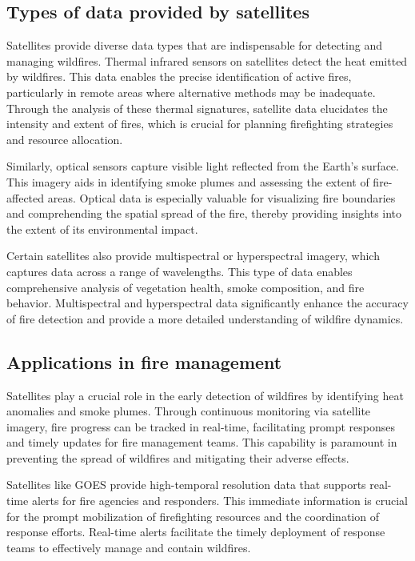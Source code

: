 \documentclass[
  12 pt,
]{Nemilov}
\begin{document}
\subsection{Types of data provided by satellites}\label{types-of-data-provided-by-satellites}

Satellites provide diverse data types that are indispensable for detecting and managing wildfires. Thermal infrared sensors on satellites detect the heat emitted by wildfires. This data enables the precise identification of active fires, particularly in remote areas where alternative methods may be inadequate. Through the analysis of these thermal signatures, satellite data elucidates the intensity and extent of fires, which is crucial for planning firefighting strategies and resource allocation.

Similarly, optical sensors capture visible light reflected from the Earth's surface. This imagery aids in identifying smoke plumes and assessing the extent of fire-affected areas. Optical data is especially valuable for visualizing fire boundaries and comprehending the spatial spread of the fire, thereby providing insights into the extent of its environmental impact.

Certain satellites also provide multispectral or hyperspectral imagery, which captures data across a range of wavelengths. This type of data enables comprehensive analysis of vegetation health, smoke composition, and fire behavior. Multispectral and hyperspectral data significantly enhance the accuracy of fire detection and provide a more detailed understanding of wildfire dynamics.

\subsection{Applications in fire management}\label{applications-in-fire-management}

Satellites play a crucial role in the early detection of wildfires by identifying heat anomalies and smoke plumes. Through continuous monitoring via satellite imagery, fire progress can be tracked in real-time, facilitating prompt responses and timely updates for fire management teams. This capability is paramount in preventing the spread of wildfires and mitigating their adverse effects.

Satellites like GOES provide high-temporal resolution data that supports real-time alerts for fire agencies and responders. This immediate information is crucial for the prompt mobilization of firefighting resources and the coordination of response efforts. Real-time alerts facilitate the timely deployment of response teams to effectively manage and contain wildfires.
\end{document}

